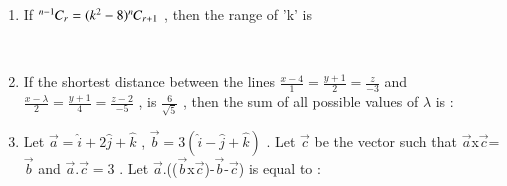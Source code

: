 \documentclass[journal,12pt,onecolumn]{IEEEtran}
\theoremstyle{remark}
\begin{document}
\begin{enumerate}
\item If ${{}^{n-1}\mkern-1muC_{r}} = (k^2 - 8){{}^{n}\mkern-1muC_{r+1}}$ , then the range of 'k' is 

\hfill{}
\begin{enumerate}
\begin{multicols}{2}
\item $ k \in (2\sqrt{2},3] $
\item $ k \in \brak{2\sqrt{2},3} $
\item $ k \in [2,3) $
\item $ k \in \brak{2\sqrt{2},8} $
\end{multicols}
\end{enumerate}
\\

\item If the shortest distance between the lines $ \frac{x-4}{1}=\frac{y+1}{2}=\frac{z}{-3} $ and $ \frac{x-\lambda}{2}=\frac{y+1}{4}=\frac{z-2}{-5} $ , is $\frac{6}{\sqrt{5}}$ , then the sum of all possible values of $\lambda$ is :

\hfill{}
\begin{enumerate}   
\end{enumerate}

\item Let $\vec{a}=\hat{i}+2\hat{j}+\hat{k}$ , $\vec{b}=3(\hat{i}-\hat{j}+\hat{k})$ . Let $\vec{c}$ be the vector such that $\vec{a}$x$\vec{c}$=$\vec{b}$ and $\vec{a}$.$\vec{c}=3$ . Let $\vec{a}$.(($\vec{b}$x$\vec{c}$)-$\vec{b}$-$\vec{c}$) is equal to : 

\hfill{}
\begin{enumerate}   
\end{enumerate}


\end{enumerate}
\end{document}
